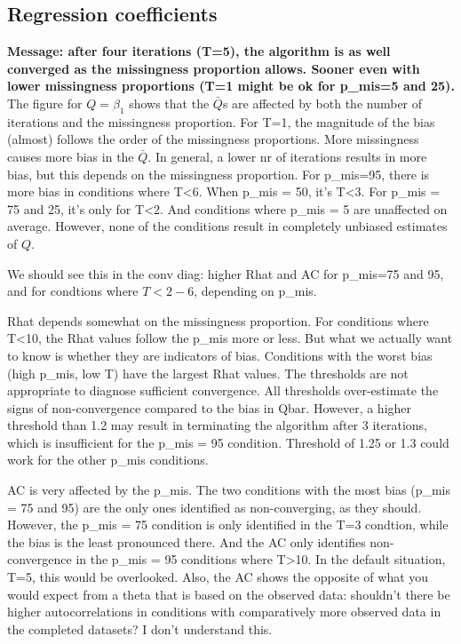 \documentclass[Royal,times,sageh]{sagej}
\begin{document}
\hypertarget{regression-coefficients}{%
\subsection{Regression coefficients}\label{regression-coefficients}}

\textbf{Message: after four iterations (T=5), the algorithm is as well
converged as the missingness proportion allows. Sooner even with lower
missingness proportions (T=1 might be ok for p\_mis=5 and 25).} The
figure for \(Q=\beta_1\) shows that the \(\bar{Q}\)s are affected by
both the number of iterations and the missingness proportion. For T=1,
the magnitude of the bias (almost) follows the order of the missingness
proportions. More missingness causes more bias in the \(\bar{Q}\). In
general, a lower nr of iterations results in more bias, but this depends
on the missingness proportion. For p\_mis=95, there is more bias in
conditions where T\textless6. When p\_mis = 50, it's T\textless3. For
p\_mis = 75 and 25, it's only for T\textless2. And conditions where
p\_mis = 5 are unaffected on average. However, none of the conditions
result in completely unbiased estimates of \(Q\).

We should see this in the conv diag: higher Rhat and AC for p\_mis=75
and 95, and for condtions where \(T<2-6\), depending on p\_mis.

Rhat depends somewhat on the missingness proportion. For conditions
where T\textless10, the Rhat values follow the p\_mis more or less. But
what we actually want to know is whether they are indicators of bias.
Conditions with the worst bias (high p\_mis, low T) have the largest
Rhat values. The thresholds are not appropriate to diagnose sufficient
convergence. All thresholds over-estimate the signs of non-convergence
compared to the bias in Qbar. However, a higher threshold than 1.2 may
result in terminating the algorithm after 3 iterations, which is
insufficient for the p\_mis = 95 condition. Threshold of 1.25 or 1.3
could work for the other p\_mis conditions.

AC is very affected by the p\_mis. The two conditions with the most bias
(p\_mis = 75 and 95) are the only ones identified as non-converging, as
they should. However, the p\_mis = 75 condition is only identified in
the T=3 condtion, while the bias is the least pronounced there. And the
AC only identifies non-convergence in the p\_mis = 95 conditions where
T\textgreater10. In the default situation, T=5, this would be
overlooked. Also, the AC shows the opposite of what you would expect
from a theta that is based on the observed data: shouldn't there be
higher autocorrelations in conditions with comparatively more observed
data in the completed datasets? I don't understand this.
\end{document}
